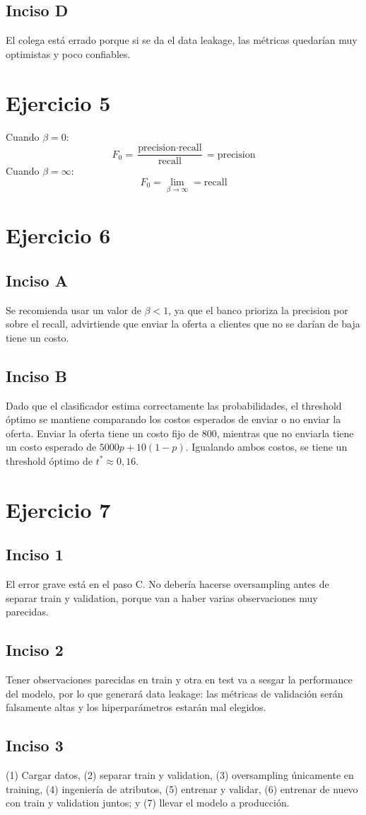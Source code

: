 \documentclass[12pt, a4paper]{article}
\begin{document}
\subsection*{Inciso D}
\noindent El colega está errado porque si se da el data leakage, las métricas quedarían muy optimistas y poco confiables.

\section*{Ejercicio 5}
\noindent Cuando $\beta = 0$: \[F_{0} = \frac{\text{precision} \cdot \text{recall}}{\text{recall}} = \text{precision}\]
\noindent Cuando $\beta = \infty$: \[F_{0} = \lim_{\beta \to \infty} = \text{recall}\]

\section*{Ejercicio 6}
\subsection*{Inciso A}
\noindent Se recomienda usar un valor de \(\beta < 1\), ya que el banco prioriza la precision por sobre el recall, advirtiende que enviar la oferta a clientes que no se darían de baja tiene un costo.
\subsection*{Inciso B}
\noindent Dado que el clasificador estima correctamente las probabilidades, el threshold óptimo se mantiene comparando los costos esperados de enviar o no enviar la oferta. Enviar la oferta tiene un costo fijo de 800, mientras que no enviarla tiene un costo esperado de $5000p+10(1-p)$. Igualando ambos costos, se tiene un threshold óptimo de $t^{*} \approx 0,16$.

\section*{Ejercicio 7}
\subsection*{Inciso 1}
\noindent El error grave está en el paso C. No debería hacerse oversampling antes de separar train y validation, porque van a haber varias observaciones muy parecidas.
\subsection*{Inciso 2}
\noindent Tener observaciones parecidas en train y otra en test va a sesgar la performance del modelo, por lo que generará data leakage: las métricas de validación serán falsamente altas y los hiperparámetros estarán mal elegidos.
\subsection*{Inciso 3}
\noindent (1) Cargar datos, (2) separar train y validation, (3) oversampling únicamente en training, (4) ingeniería de atributos, (5) entrenar y validar, (6) entrenar de nuevo con train y validation juntos; y (7) llevar el modelo a producción.
\end{document}

